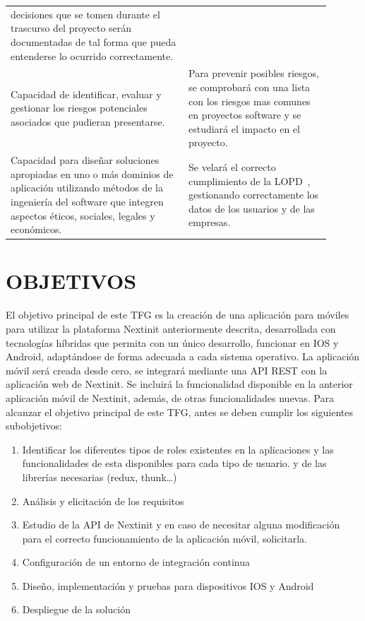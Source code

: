 \documentclass{pre-tfg}
\begin{document}
\begin{table}[hp]
\begin{tabular}{p{0.5\linewidth}p{0.4\linewidth}}
            decisiones que se tomen durante el trascurso del proyecto serán documentadas de tal forma que
            pueda entenderse lo ocurrido correctamente. \\
            Capacidad de identificar, evaluar y gestionar los riesgos potenciales asociados que pudieran presentarse.
            & Para prevenir posibles riesgos, se comprobará con una lista con los riesgos mas comunes en proyectos
            software y se estudiará el impacto en el proyecto. \\
            Capacidad para diseñar soluciones apropiadas en uno o más dominios de aplicación utilizando métodos
            de la ingeniería del software que integren aspectos éticos, sociales, legales y económicos.
            & Se velará el correcto cumplimiento de la LOPD~\cite{LOPD}, gestionando correctamente los datos de los
            usuarios y de las empresas.\\
            \hline
        \end{tabular}
    \end{table}

	\clearpage

    \section{OBJETIVOS}

    El objetivo principal de este TFG es la creación de una aplicación para móviles para utilizar la plataforma 
    Nextinit anteriormente descrita, desarrollada con tecnologías híbridas que permita con un único 
    desarrollo, funcionar en IOS y Android, adaptándose de forma adecuada a cada sistema operativo. La 
    aplicación móvil será creada desde cero, se integrará mediante una API REST con la aplicación web de 
    Nextinit. Se incluirá la funcionalidad disponible en la anterior aplicación móvil de Nextinit, además, de otras 
    funcionalidades nuevas.
    \newline\newline
    Para alcanzar el objetivo principal de este TFG, antes se deben cumplir los siguientes subobjetivos:
    \begin{enumerate}
        \item Identificar los diferentes tipos de roles existentes en la aplicaciones y las funcionalidades 
        de esta disponibles para cada tipo de usuario.
        y de las librerías necesarias (redux, thunk…)
        \item Análisis y elicitación de los requisitos
        \item Estudio de la API de Nextinit y en caso de necesitar alguna modificación para el correcto
        funcionamiento de la aplicación móvil, solicitarla.
        \item Configuración de un entorno de integración continua
        \item Diseño, implementación y pruebas para dispositivos IOS y Android
        \item Despliegue de la solución
    \end{enumerate}
\end{document}
